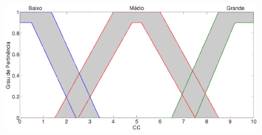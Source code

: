 \documentclass[tcc,capa]{texufpel}
\begin{document}
\begin{figure}[h]
\centering
\includegraphics[scale=0.15]{images/Plot2_CC.png}
 \label{fig:CC_tipo1e2}
\end{figure}
\end{document}
